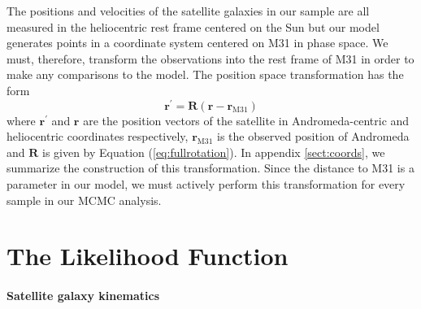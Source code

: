 \documentclass[preprint]{aastex}
\newcommand{\eq}[1]{Equation (\ref{eq:#1})}
\newcommand{\bvec}[1]{\ensuremath{\boldsymbol{#1}}}
\begin{document}
The positions and velocities of the satellite galaxies in our sample are all
measured in the heliocentric rest frame centered on the Sun but our model generates
points in a coordinate system centered on M31 in phase space. We must, therefore,
transform the observations into the rest frame of M31 in order to make any
comparisons to the model. The position space transformation has the form
\citep{Metz:2007}
\begin{equation}
    \bvec{r^\prime} = \bvec{R} (\bvec{r} - \bvec{r_\mathrm{M31}})
\end{equation}
where \bvec{r^\prime} and \bvec{r} are the position vectors of the satellite in
Andromeda-centric and heliocentric coordinates respectively, \bvec{r_\mathrm{M31}}
is the observed position of Andromeda and \bvec{R} is given by \eq{fullrotation}.
In appendix \ref{sect:coords}, we summarize the construction of this
transformation. Since the distance to M31 is a parameter in our model, we must
actively perform this transformation for every sample in our MCMC analysis.


\section{The Likelihood Function}

\paragraph{Satellite galaxy kinematics}
\end{document}
